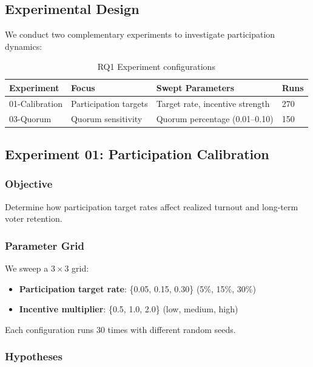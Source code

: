 
\subsection{Experimental Design}

We conduct two complementary experiments to investigate participation dynamics:

\begin{table}[htbp]
\centering
\caption{RQ1 Experiment configurations}
\label{tab:rq1-experiments}
\begin{tabular}{@{}llll@{}}
\toprule
Experiment & Focus & Swept Parameters & Runs \\
\midrule
01-Calibration & Participation targets & Target rate, incentive strength & 270 \\
03-Quorum & Quorum sensitivity & Quorum percentage (0.01--0.10) & 150 \\
\bottomrule
\end{tabular}
\end{table}

\subsection{Experiment 01: Participation Calibration}

\subsubsection{Objective}

Determine how participation target rates affect realized turnout and long-term voter retention.

\subsubsection{Parameter Grid}

We sweep a $3 \times 3$ grid:

\begin{itemize}
    \item \textbf{Participation target rate}: \{0.05, 0.15, 0.30\} (5\%, 15\%, 30\%)
    \item \textbf{Incentive multiplier}: \{0.5, 1.0, 2.0\} (low, medium, high)
\end{itemize}

Each configuration runs 30 times with different random seeds.

\subsubsection{Hypotheses}

